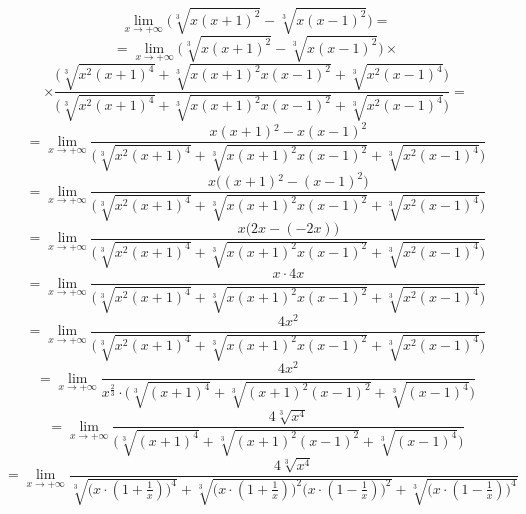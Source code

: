 \documentclass{article}
\begin{document}
\begin{equation*}
    \lim_{x \to + \infty} \Big(\sqrt[3]{x(x+1)^2} - \sqrt[3]{x(x-1)^2}\Big) = 
\end{equation*}
\begin{equation*}
    = \lim_{x \to + \infty} \Big(\sqrt[3]{x(x+1)^2} - \sqrt[3]{x(x-1)^2}\Big) \times 
\end{equation*}
\begin{equation*}
    \times \frac{\Big(\sqrt[3]{x^{2}(x+1)^4} + \sqrt[3]{x(x+1)^{2}x(x-1)^{2}} +  \sqrt[3]{x^{2}(x-1)^4}\Big)}{\Big(\sqrt[3]{x^{2}(x+1)^4} + \sqrt[3]{x(x+1)^{2}x(x-1)^{2}} +  \sqrt[3]{x^{2}(x-1)^4}\Big)} =
\end{equation*}
\begin{equation*}
    = \lim_{x \to + \infty} \frac{x(x+1){^2} - x(x-1)^2}{\Big(\sqrt[3]{x^{2}(x+1)^4} + \sqrt[3]{x(x+1)^{2}x(x-1)^{2}} +  \sqrt[3]{x^{2}(x-1)^4}\Big)}
\end{equation*}
\begin{equation*}
    = \lim_{x \to + \infty} \frac{x \Big((x+1){^2} - (x-1)^2\Big)}{\Big(\sqrt[3]{x^{2}(x+1)^4} + \sqrt[3]{x(x+1)^{2}x(x-1)^{2}} +  \sqrt[3]{x^{2}(x-1)^4}\Big)}
\end{equation*}
\begin{equation*}
    = \lim_{x \to + \infty} \frac{x \Big( 2x - (-2x) \Big)}{\Big(\sqrt[3]{x^{2}(x+1)^4} + \sqrt[3]{x(x+1)^{2}x(x-1)^{2}} +  \sqrt[3]{x^{2}(x-1)^4}\Big)}
\end{equation*}
\begin{equation*}
    = \lim_{x \to + \infty} \frac{x \cdot 4x}{\Big(\sqrt[3]{x^{2}(x+1)^4} + \sqrt[3]{x(x+1)^{2}x(x-1)^{2}} +  \sqrt[3]{x^{2}(x-1)^4}\Big)}
\end{equation*}
\begin{equation*}
    = \lim_{x \to + \infty} \frac{4x^2}{\Big(\sqrt[3]{x^{2}(x+1)^4} + \sqrt[3]{x(x+1)^{2}x(x-1)^{2}} +  \sqrt[3]{x^{2}(x-1)^4}\Big)}
\end{equation*}
\begin{equation*}
    = \lim_{x \to + \infty} \frac{4x^2}{x^{\frac{2}{3}} \cdot \Big(\sqrt[3]{(x+1)^4} + \sqrt[3]{(x+1)^{2}(x-1)^{2}} +  \sqrt[3]{(x-1)^4}\Big)}
\end{equation*}
\begin{equation*}
    = \lim_{x \to + \infty} \frac{4 \sqrt[3]{x^4}}{\Big(\sqrt[3]{(x+1)^4} + \sqrt[3]{(x+1)^{2}(x-1)^{2}} +  \sqrt[3]{(x-1)^4}\Big)}
\end{equation*}
\begin{equation*}
    = \lim_{x \to + \infty} \frac{4 \sqrt[3]{x^4}}{\sqrt[3]{\Big(x \cdot (1 + \frac{1}{x})\Big)^4} + \sqrt[3]{\Big(x \cdot (1 + \frac{1}{x})\Big)^{2}\Big(x \cdot (1 - \frac{1}{x})\Big)^{2}} +  \sqrt[3]{\Big(x \cdot (1 - \frac{1}{x})\Big)^4}}
\end{equation*}
\end{document}
